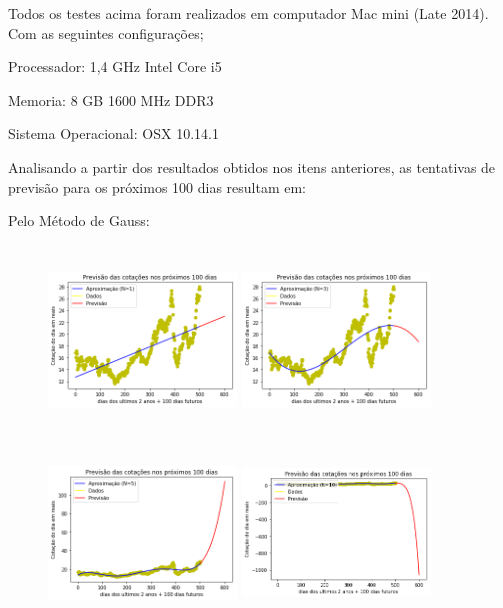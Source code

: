 \documentclass{article}
\begin{document}
\text Todos os testes acima foram realizados em computador Mac mini (Late 2014).
Com as seguintes configurações;
\item Processador: 1,4 GHz Intel Core i5
\item Memoria: 8 GB 1600 MHz DDR3
\item Sistema Operacional: OSX 10.14.1

\newpage 
Analisando a partir dos resultados obtidos nos itens anteriores, as tentativas de previsão para os próximos 100 dias resultam em:

\item Pelo Método de Gauss:
\begin{figure}[!htb]
\includegraphics [width=5cm,height=5cm]{PrevisaoG/P1.png}
\includegraphics [width=5cm,height=5cm]{PrevisaoG/P3.png}
\includegraphics [width=5cm,height=5cm]{PrevisaoG/P5.png}
\includegraphics [width=5cm,height=5cm]{PrevisaoG/P10.png}

\end{figure}
\end{document}
